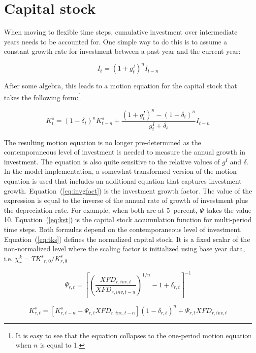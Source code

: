 \section{Capital stock}
\label{sec:kstock}

When moving to flexible time
steps, cumulative investment over intermediate years needs to be accounted for.
One simple way to do this is to assume a constant growth rate for investment
between a past year and the current year:

\[
I_t = \left(1+ g^I_t \right)^n  I_{t-n}
\]

After some algebra, this leads to a motion equation for the capital stock that
takes the following form:\footnote{It is easy to see that the equation collapses
to the one-period motion equation when $n$ is equal to 1.}

\[
K^s_t =
   \left( 1- \delta_t \right)^n K^s_{t-n}
+  \frac {\left( 1 + g^I_t \right)^n - \left( 1 - \delta_t \right)^n}
         {g^I_t + \delta_t} I_{t-n}
\]

The resulting motion equation is no longer pre-determined as the contemporaneous
level of investment is needed to measure the annual growth in investment. The
equation is also quite sensitive to the relative values of $g^I$ and $\delta$.
In the model implementation, a somewhat transformed version of the motion
equation is used that includes an additional equation that captures investment
growth. Equation~(\ref{eq:invgfact}) is the investment growth factor. The value
of the expression is equal to the inverse of the annual rate of growth of
investment plus the depreciation rate. For example, when both are at 5~percent,
$\Psi$ takes the value 10. Equation~(\ref{eq:kst}) is the capital stock
accumulation function for multi-period time steps. Both formulas depend on the
contemporaneous level of investment. Equation~(\ref{eq:tks}) defines the
normalized capital stock. It is a fixed scalar of the non-normalized level where
the scaling factor is initialized using base year data,
i.e. $\chi^k_r = \mathit{TK^s}_{r,0}/K^s_{r,0}$

\begin{equation}
\label{eq:invgfact}
\Psi_{r,t} =
   \left[ \left( \frac {\mathit{XFD_{r,\mathit{inv},t}}}
      {\mathit{XFD_{r,\mathit{inv},t-n}}}\right)^{1/n} -1 + \delta_{r,t}
   \right]^{-1}
\end{equation}

\begin{equation}
\label{eq:kst}
\mathit{K^s_{r,t}} =
   \left[ \mathit{K^s_{r,t-n}}
-  \Psi_{r,t} \mathit{XFD_{r,\mathit{inv},t-n}}\right]
   \left( 1 - \delta_{r,t} \right)^n
+  \Psi_{r,t} \mathit{XFD_{r,\mathit{inv},t}}
\end{equation}

